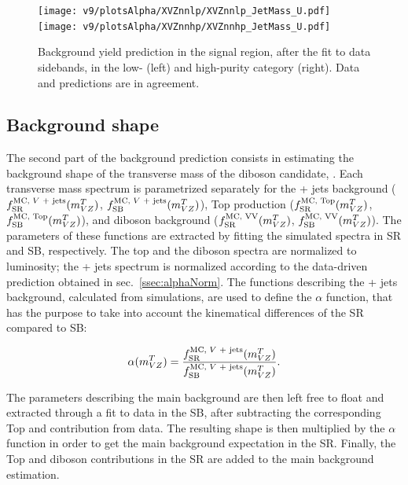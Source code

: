 \begin{figure}[!htb]
  \centering
    \texttt{[image: v9/plotsAlpha/XVZnnlp/XVZnnlp\_JetMass\_U.pdf]}
    \texttt{[image: v9/plotsAlpha/XVZnnhp/XVZnnhp\_JetMass\_U.pdf]}
  \caption{Background yield prediction in the signal region, after the fit to data sidebands, in the low- (left) and high-purity category (right). Data and predictions are in agreement.}
  \label{fig:XVZnn_JetMass}
\end{figure}








\subsection{Background shape}\label{ssec:alphaShape}

The second part of the background prediction consists in estimating the background shape of the transverse mass of the diboson candidate, \mtVZ. Each transverse mass spectrum is parametrized separately for the \V + jets background ($f_{\text{SR}}^{\text{MC, \V + jets}}(\mtVZ)$, $f_{\text{SB}}^{\text{MC, \V + jets}}(\mtVZ)$), Top production ($f_{\text{SR}}^{\text{MC, Top}}(m_{VZ}^T)$, $f_{\text{SB}}^{\text{MC, Top}}(m_{VZ}^T)$), and diboson background ($f_{\text{SR}}^{\text{MC, VV}}(m_{VZ}^T)$, $f_{\text{SB}}^{\text{MC, VV}}(m_{VZ}^T)$). The parameters of these functions are extracted by fitting the simulated \mtVZ spectra in SR and SB, respectively. The top and the diboson spectra are normalized to luminosity; the \V + jets spectrum is normalized according to the data-driven prediction obtained in sec.~\ref{ssec:alphaNorm}. The functions describing the \V + jets background, calculated from simulations, are used to define the $\alpha$ function, that has the purpose to take into account the kinematical differences of the SR compared to SB:

\begin{equation}
\alpha(\mtVZ) = \frac{f_{\text{SR}}^{\text{MC, \V + jets}}(\mtVZ)}{f_{\text{SB}}^{\text{MC, \V + jets}}(\mtVZ)}.
\end{equation}

\noindent The parameters describing the main background are then left free to float and extracted through a fit to data in the SB, after subtracting the corresponding Top and \VV contribution from data. The resulting shape is then multiplied by the $\alpha$ function in order to get the main background expectation in the SR. Finally, the Top and diboson contributions in the SR are added to the main background estimation.

